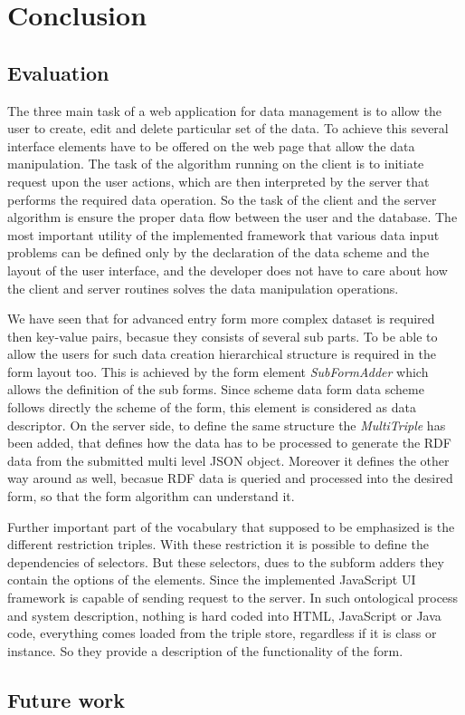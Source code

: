 

\chapter{Conclusion}

\section{Evaluation}

The three main task of a web application for data management is to allow the user to create, edit and delete particular set of the data. To achieve this several interface elements have to be offered on the web page that allow the data manipulation. The task of the algorithm running on the client is to initiate request upon the user actions, which are then interpreted by the server that performs the required data operation. So the task of the client and the server algorithm is ensure the proper data flow between the user and the database. The most important utility of the implemented framework that various data input problems can be defined only by the declaration of the data scheme and the layout of the user interface, and the developer does not have to care about how the client and server routines solves the data manipulation operations. 







We have seen that for advanced entry form more complex dataset is required then key-value pairs, becasue they consists of several sub parts. To be able to allow the users for such data creation hierarchical structure is required in the form layout too. This is achieved by the form element \textit{SubFormAdder} which allows the definition of the sub forms. Since scheme data form data scheme follows directly the scheme of the form, this element is considered as data descriptor. On the server side, to define the same structure the \textit{MultiTriple} has been added, that defines how the data has to be processed to generate the RDF data from the submitted multi level JSON object. Moreover it defines the other way around as well, becasue RDF data is queried and processed into the desired form, so that the form algorithm can understand it. 




Further important part of the vocabulary that supposed to be emphasized is the different restriction triples. With these restriction it is possible to define the dependencies of selectors. But these selectors, dues to the subform adders they contain the options of the elements. Since the implemented JavaScript UI framework is capable of sending request to the server. In such ontological process and system description, nothing is hard coded into HTML, JavaScript or Java code, everything comes loaded from the triple store, regardless if it is class or instance. So they provide a description of the functionality of the form. 


\section{Future work}

